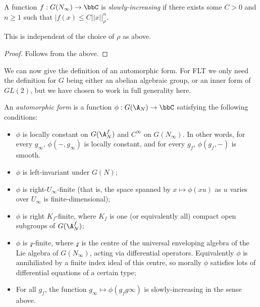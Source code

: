 \begin{definition}\label{slowly_increasing}\notready A function $f : G(N_\infty)\to\bbC$ is \emph{slowly-increasing} if there exists some $C>0$
    and $n\geq1$ such that $|f(x)\leq C||x||_\rho^n$.
\end{definition}

\begin{theorem}\label{slowly_increasing_well_defined}\notready This is independent of the choice of $\rho$ as above.
\end{theorem}
\begin{proof} Follows from the above.
\end{proof}

We can now give the definition of an automorphic form. For FLT we only need the definition for $G$ being either an abelian algebraic group, or an inner form of $GL(2)$, but we have chosen to work in full generality here.

\begin{definition}\label{automorphic_form}\notready An \emph{automorphic form} is a function $\phi:G(\A_N)\to\bbC$ satisfying the following conditions:
    \begin{itemize}
        \item $\phi$ is locally constant on $G(\A_N^f)$ and $C^\infty$ on $G(N_\infty)$. In other words, for every $g_\infty$, $\phi(-,g_\infty)$ is locally constant, and for every $g_f$, $\phi(g_f,-)$ is smooth.
        \item $\phi$ is left-invariant under $G(N)$;
        \item $\phi$ is right-$U_\infty$-finite (that is, the space spanned by $x\mapsto \phi(xu)$ as $u$ varies over $U_\infty$ is finite-dimensional);
        \item $\phi$ is right $K_f$-finite, where $K_f$ is one (or equivalently all) compact open subgroups of $G(\A_N^f)$;
        \item $\phi$ is $\mathcal{z}$-finite, where $\mathcal{z}$ is the centre of the universal enveloping algebra of the Lie algebra of $G(N_\infty)$, acting via differential operators. Equivalently $\phi$ is annihiliated by a finite index ideal of this centre, so morally $\phi$ satisfies lots of differential equations of a certain type;
        \item For all $g_f$, the function $g_\infty\mapsto \phi(g_f g\infty)$ is slowly-increasing in the sense above.
    \end{itemize}
\end{definition}

